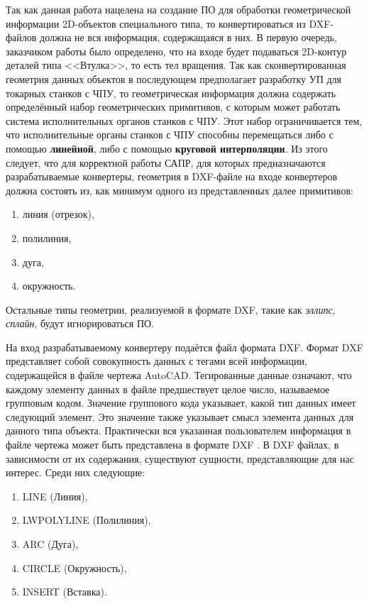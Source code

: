 Так как данная работа нацелена на создание ПО для обработки геометрической информации 2D-объектов специального типа, то конвертироваться из DXF-файлов должна не вся информация, содержащаяся в них. В первую очередь, заказчиком работы было определено, что на входе будет подаваться 2D-контур деталей типа <<Втулка>>, то есть тел вращения. Так как сконвертированная геометрия данных объектов в последующем предполагает разработку УП для токарных станков с ЧПУ, то геометрическая информация должна содержать определённый набор геометрических примитивов, с которым может работать система исполнительных органов станков с ЧПУ. Этот набор ограничивается тем, что исполнительные органы станков с ЧПУ способны перемещаться либо с помощью \textbf{линейной}, либо с помощью \textbf{круговой интерполяции}. Из этого следует, что для корректной работы САПР, для которых предназначаются разрабатываемые конвертеры, геометрия в DXF-файле на входе конвертеров должна состоять из, как минимум одного из представленных далее примитивов:

\begin{enumerate}
	\item линия (отрезок),
	\item полилиния,
	\item дуга,
	\item окружность.
\end{enumerate}

Остальные типы геометрии, реализуемой в формате DXF, такие как \textit{эллипс}, \textit{сплайн}, будут игнорироваться ПО.

На вход разрабатываемому конвертеру подаётся файл формата DXF. Формат DXF представляет собой совокупность данных с тегами всей информации, содержащейся в файле чертежа AutoCAD. Тегированные данные означают, что каждому элементу данных в файле предшествует целое число, называемое групповым кодом. Значение группового кода указывает, какой тип данных имеет следующий элемент. Это значение также указывает смысл элемента данных для данного типа объекта. Практически вся указанная пользователем информация в файле чертежа может быть представлена в формате DXF \cite{Autodesk}.
В DXF файлах, в зависимости от их содержания, существуют сущности, представляющие для нас интерес. Среди них следующие:

\begin{enumerate}
	\item LINE (Линия),
	\item LWPOLYLINE (Полилиния),
	\item ARC (Дуга),
	\item CIRCLE (Окружность),
	\item INSERT (Вставка).
\end{enumerate}

